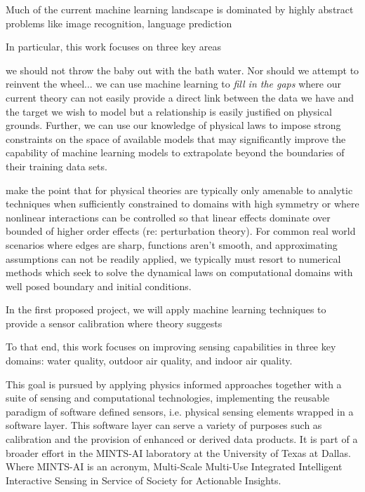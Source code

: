 Much of the current machine learning landscape is dominated by highly abstract problems like image recognition, language prediction

In particular, this work focuses on three key areas

we should not throw the baby out with the bath water. Nor should we attempt to reinvent the wheel... we can use machine learning to \textit{fill in the gaps} where our current theory can not easily provide a direct link between the data we have and the target we wish to model but a relationship is easily justified on physical grounds. Further, we can use our knowledge of physical laws to impose strong constraints on the space of available models that may significantly improve the capability of machine learning models to extrapolate beyond the boundaries of their training data sets. 

make the point that for physical theories are typically only amenable to analytic techniques when sufficiently constrained to domains with high symmetry or where nonlinear interactions can be controlled so that linear effects dominate over bounded of higher order effects (re: perturbation theory). For common real world scenarios where edges are sharp, functions aren't smooth, and approximating assumptions can not be readily applied, we typically must resort to numerical methods which seek to solve the dynamical laws on computational domains with well posed boundary and initial conditions.

In the first proposed project, we will apply machine learning techniques to provide a sensor calibration where theory suggests


To that end, this work focuses on improving sensing capabilities in three key domains: water quality, outdoor air quality, and indoor air quality.









This goal is pursued by applying physics informed approaches together with a suite of sensing and computational technologies, implementing the reusable paradigm of software defined sensors, i.e. physical sensing elements wrapped in a software layer. This software layer can serve a variety of purposes such as calibration and the provision of enhanced or derived data products. It is part of a broader effort in the MINTS-AI laboratory at the University of Texas at Dallas. Where MINTS-AI is an acronym, Multi-Scale Multi-Use Integrated Intelligent Interactive Sensing in Service of Society for Actionable Insights.

